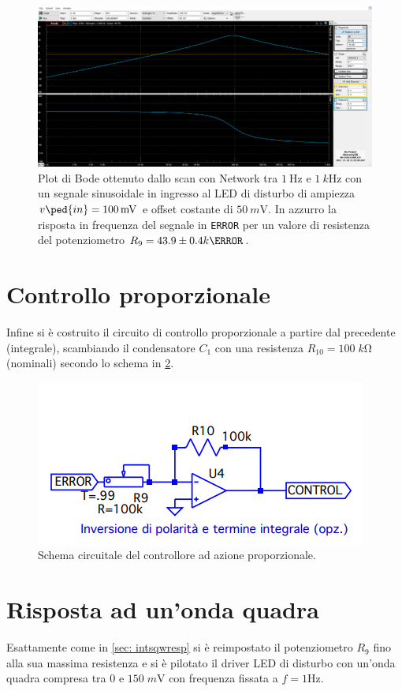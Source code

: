 \documentclass[10pt, a4paper, italian]{article}
\begin{document}
\begin{figure}[htbp]
    \centering
	\includegraphics[width=\textwidth]{43.9k}
    \caption{Plot di Bode ottenuto dallo scan con Network tra $\SI{1}{\Hz}$ e
	$\SI{1}{k\Hz}$ con un segnale sinusoidale in ingresso al LED di disturbo di
	ampiezza $v\ped{in} = \SI{100}{m\V}$ e offset costante di $\SI{50}{m\V}$.
	In azzurro la risposta in frequenza del segnale in \texttt{ERROR} per un
	valore di resistenza del potenziometro $R_9 = 43.9 \pm 0.4 k\ohm$.
    \label{fig: netR44}}
\end{figure}

\section*{Controllo proporzionale}
Infine si è costruito il circuito di controllo proporzionale a partire dal
precedente (integrale), scambiando il condensatore $C_1$ con una resistenza
$R_{10} = 100 \; \si{k\ohm}$ (nominali) secondo lo schema in \cref{schm: prop}.
\begin{figure}[htbp]
    \centering
	\includegraphics[scale=0.6]{controlgenprop}
    \caption{Schema circuitale del controllore ad azione proporzionale.
    \label{schm: prop}}
\end{figure}

\section{Risposta ad un'onda quadra}
Esattamente come in \cref{sec: intsqwresp} si è reimpostato il potenziometro
$R_9$ fino alla sua massima resistenza e si è pilotato il driver LED di
disturbo con un'onda quadra compresa tra $0$ e $150 \; \si{m\V}$ con frequenza
fissata a $f = 1 \si{\Hz}$.
\end{document}
